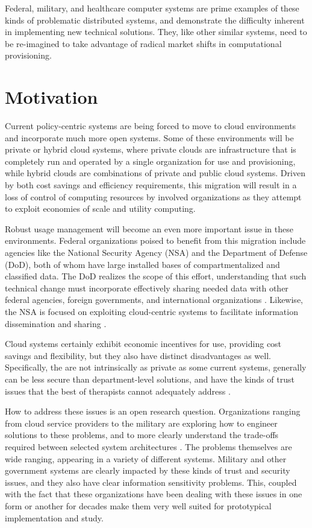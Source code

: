 Federal, military, and healthcare computer systems are prime examples of these kinds of problematic distributed systems, and demonstrate the difficulty inherent in implementing new technical solutions.  They, like other similar systems, need to be re-imagined to take advantage of radical market shifts in computational provisioning.

\section{Motivation}
Current policy-centric systems are being forced to move to cloud environments and incorporate much more open systems.  Some of these environments will be private or hybrid cloud systems, where private clouds are infrastructure that is completely run and operated by a single organization for use and provisioning, while hybrid clouds are combinations of private and public cloud systems.  Driven by both cost savings and efficiency requirements, this migration will result in a loss of control of computing resources by involved organizations as they attempt to exploit economies of scale and utility computing.

Robust usage management will become an even more important issue in these environments.  Federal organizations poised to benefit from this migration include agencies like the National Security Agency (NSA) and the Department of Defense (DoD), both of whom have large installed bases of compartmentalized and classified data.  The DoD realizes the scope of this effort, understanding that such technical change must incorporate effectively sharing needed data with other federal agencies, foreign governments, and international organizations \cite{proposal:info-sharing-strategy}.  Likewise, the NSA is focused on exploiting cloud-centric systems to facilitate information dissemination and sharing \cite{proposal:nsa-cloud}.

Cloud systems certainly exhibit economic incentives for use, providing cost savings and flexibility, but they also have distinct disadvantages as well.  Specifically, the are not intrinsically as private as some current systems, generally can be less secure than department-level solutions, and have the kinds of trust issues that the best of therapists cannot adequately address \cite{proposal:privacy-security-trust-cloud}.

How to address these issues is an open research question.  Organizations ranging from cloud service providers to the military are exploring how to engineer solutions to these problems, and to more clearly understand the trade-offs required between selected system architectures \cite{proposal:assured-info-sharing}.  The problems themselves are wide ranging, appearing in a variety of different systems.  Military and other government systems are clearly impacted by these kinds of trust and security issues, and they also have clear information sensitivity problems.  This, coupled with the fact that these organizations have been dealing with these issues in one form or another for decades make them very well suited for prototypical implementation and study.

